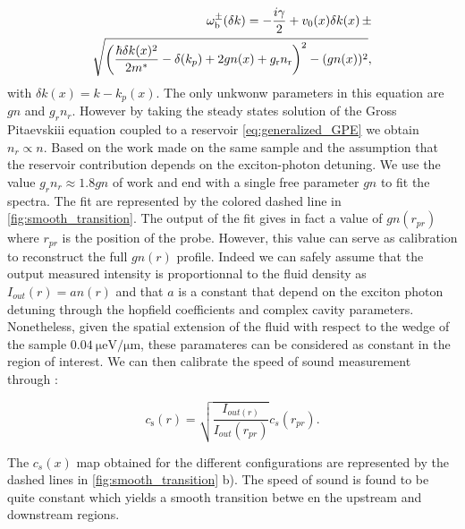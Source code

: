 \begin{equation}
    \label{eq:lfbogo}
    \begin{split}
        \omega_{\mathrm{b}}^{\pm}(\delta k)= -\frac{i\gamma}{2}+ v_0(x) \delta k(x)\,\pm \\\sqrt{\left(\frac{\hbar \delta k(x)^2}{2m^*}-\delta(k_p) +2gn(x) +g_\mathrm{r} n_\mathrm{r}    \right)^2-(gn(x))^2},
    \end{split}
\end{equation}
with $\delta k(x)=k-k_p(x)$. The only unkwonw parameters in this equation are $gn$ and $g_rn_r$. However by taking the steady states solution of the Gross Pitaevskiii equation coupled to a reservoir \autoref{eq:generalized_GPE} we obtain $n_r\propto n$.
Based on the work \cite{claude_phd,claude_high-resolution_2022} made on the same sample and the assumption that the reservoir contribution depends on the exciton-photon detuning. We use the value $g_rn_r\approx 1.8gn$ of work \cite{claude_phd} and end 
with a single free parameter $gn$ to fit the spectra. The fit are represented by the colored dashed line in \autoref{fig:smooth_transition}. The output of the fit gives in fact a value of $gn(r_{pr})$ where $r_{pr}$ is the position of the probe. However, this value can serve 
as calibration to reconstruct the full $gn(r)$ profile. Indeed we can safely assume that the output measured intensity is proportionnal to the 
fluid density as $I_{out}(r)=a n(r)$ and that $a$ is a constant that depend on the exciton photon detuning through the hopfield coefficients and complex 
cavity parameters. Nonetheless, given the spatial extension of the fluid with respect to the wedge of the sample $\SI{0.04}{\micro \electronvolt \per \micro \meter}$, these paramateres can be considered as constant in the region of interest.
We can then calibrate the speed of sound measurement through :

\begin{equation}
    \label{eq:speed_of_sound_calib}
    c_\mathrm{s}(r)=\sqrt{\frac{I_{out(r)}}{I_{out}(r_{pr})}}c_s(r_{pr}).
\end{equation}

The $c_s(x)$ map obtained for the different configurations are represented by the dashed lines in \autoref{fig:smooth_transition} b). The speed of sound is found to be quite constant which yields a smooth transition betwe en the upstream and downstream regions. 

\bigskip

